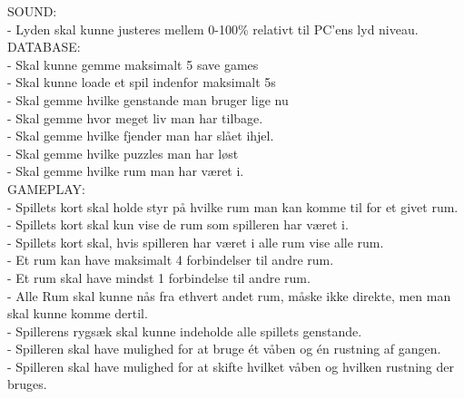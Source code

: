   SOUND:\\
    - Lyden skal kunne justeres mellem 0-100\% relativt til PC'ens lyd niveau.\\

  DATABASE:\\
    - Skal kunne gemme maksimalt 5 save games\\
    - Skal kunne loade et spil indenfor maksimalt 5s\\
    - Skal gemme hvilke genstande man bruger lige nu\\
    - Skal gemme hvor meget liv man har tilbage.\\
    - Skal gemme hvilke fjender man har slået ihjel.\\
    - Skal gemme hvilke puzzles man har løst\\
    - Skal gemme hvilke rum man har været i.\\
    
  GAMEPLAY:\\
    - Spillets kort skal holde styr på hvilke rum man kan komme til for et givet rum.\\
    - Spillets kort skal kun vise de rum som spilleren har været i.\\
    - Spillets kort skal, hvis spilleren har været i alle rum vise alle rum.\\
    
    - Et rum kan have maksimalt 4 forbindelser til andre rum.\\
    - Et rum skal have mindst 1 forbindelse til andre rum.\\
    - Alle Rum skal kunne nås fra ethvert andet rum, måske ikke direkte, men man skal kunne komme dertil.\\
    
    - Spillerens rygsæk skal kunne indeholde alle spillets genstande.\\
    - Spilleren skal have mulighed for at bruge ét våben og én rustning af gangen.\\
    - Spilleren skal have mulighed for at skifte hvilket våben og hvilken rustning der bruges.\\
   
